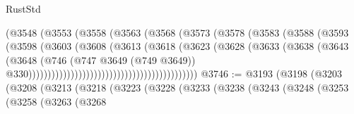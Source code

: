 \begin{lexlean}{RustStd}
\begin{coremodule}
                                                (@3548
                                                  (@3553
                                                    (@3558
                                                      (@3563
                                                        (@3568
                                                          (@3573
                                                            (@3578
                                                              (@3583
                                                                (@3588
                                                                  (@3593
                                                                    (@3598
                                                                      (@3603
                                                                        (@3608
                                                                          (@3613
                                                                            (@3618
                                                                              (@3623
                                                                                (@3628
                                                                                  (@3633
                                                                                    (@3638
                                                                                      (@3643
                                                                                        (@3648
                                                                                          (@746
                                                                                            (@747
                                                                                              @3649
                                                                                              (@749
                                                                                                @3649))
                                                                                            @330))))))))))))))))))))))))))))))))))))))))))))
@3746 := @3193
    (@3198
      (@3203
        (@3208
          (@3213
            (@3218
              (@3223
                (@3228
                  (@3233
                    (@3238
                      (@3243
                        (@3248
                          (@3253
                            (@3258
                              (@3263
                                (@3268

\end{coremodule}
\end{lexlean}
